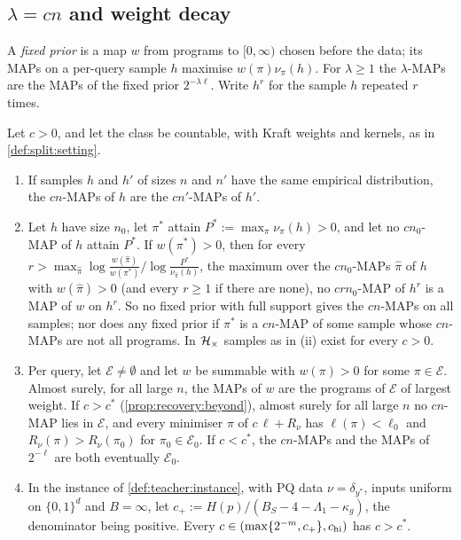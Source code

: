 \subsection{\texorpdfstring{$\lambda=cn$}{lambda=cn} and weight decay}\label{app:teacher:weightdecay}

A \emph{fixed prior} is a map $w$ from programs to $[0,\infty)$ chosen before the data; its MAPs on a per-query sample $h$ maximise $w(\pi)\nu_\pi(h)$. For $\lambda\ge1$ the $\lambda$-MAPs are the MAPs of the fixed prior $2^{-\lambda\ell}$. Write $h^r$ for the sample $h$ repeated $r$ times.

\begin{proposition}\label{prop:teacher:nofixedprior}
Let $c>0$, and let the class be countable, with Kraft weights and kernels, as in \cref{def:split:setting}.
\begin{enumerate}[label=(\roman*),itemsep=0pt,topsep=2pt]
\item If samples $h$ and $h'$ of sizes $n$ and $n'$ have the same empirical distribution, the $cn$-MAPs of $h$ are the $cn'$-MAPs of $h'$.
\item Let $h$ have size $n_0$, let $\pi^*$ attain $P^*:=\max_\pi\nu_\pi(h)>0$, and let no $cn_0$-MAP of $h$ attain $P^*$. If $w(\pi^*)>0$, then for every $r>\max_{\hat\pi}\log\frac{w(\hat\pi)}{w(\pi^*)}\big/\log\frac{P^*}{\nu_{\hat\pi}(h)}$, the maximum over the $cn_0$-MAPs $\hat\pi$ of $h$ with $w(\hat\pi)>0$ (and every $r\ge1$ if there are none), no $crn_0$-MAP of $h^r$ is a MAP of $w$ on $h^r$. So no fixed prior with full support gives the $cn$-MAPs on all samples; nor does any fixed prior if $\pi^*$ is a $cn$-MAP of some sample whose $cn$-MAPs are not all programs. In $\mathcal{H}_{\times}$ samples as in (ii) exist for every $c>0$.
\item Per query, let $\mathcal E\ne\emptyset$ and let $w$ be summable with $w(\pi)>0$ for some $\pi\in\mathcal E$. Almost surely, for all large $n$, the MAPs of $w$ are the programs of $\mathcal E$ of largest weight. If $c>c^*$ (\cref{prop:recovery:beyond}), almost surely for all large $n$ no $cn$-MAP lies in $\mathcal E$, and every minimiser $\pi$ of $c\,\ell+R_\nu$ has $\ell(\pi)<\ell_0$ and $R_\nu(\pi)>R_\nu(\pi_0)$ for $\pi_0\in\mathcal E_0$. If $c<c^*$, the $cn$-MAPs and the MAPs of $2^{-\ell}$ are both eventually $\mathcal E_0$.
\item In the instance of \cref{def:teacher:instance}, with PQ data $\nu=\delta_{y^*}$, inputs uniform on $\{0,1\}^d$ and $B=\infty$, let $c_+:=H(p)/(B_S-4-\Lambda_1-\kappa_g)$, the denominator being positive. Every $c\in(\max\{2^{-m},c_+\},c_{\rm hi})$ has $c>c^*$.
\end{enumerate}
\end{proposition}

